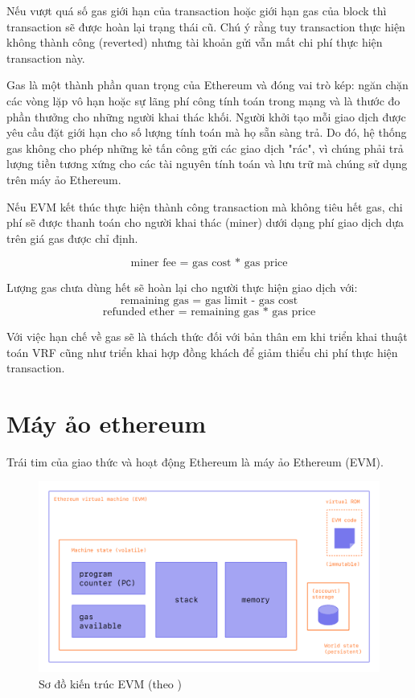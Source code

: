 \documentclass[../main.tex]{subfiles}
\begin{document}
Nếu vượt quá số gas giới hạn của transaction hoặc giới hạn gas của block thì transaction sẽ được hoàn lại trạng thái cũ. Chú ý rằng tuy transaction thực hiện không thành công (reverted) nhưng tài khoản gửi vẫn mất chi phí thực hiện transaction này.

Gas là một thành phần quan trọng của Ethereum và đóng vai trò kép: ngăn chặn các vòng lặp vô hạn hoặc sự lãng phí công tính toán trong mạng và là thước đo phần thưởng cho những người khai thác khối. Người khởi tạo mỗi giao dịch được yêu cầu đặt giới hạn cho số lượng tính toán mà họ sẵn sàng trả. Do đó, hệ thống gas không cho phép những kẻ tấn công gửi các giao dịch "rác", vì chúng phải trả lượng tiền tương xứng cho các tài nguyên tính toán và lưu trữ mà chúng sử dụng trên máy ảo Ethereum.

Nếu EVM kết thúc thực hiện thành công transaction mà không tiêu hết gas, chi phí sẽ được thanh toán cho người khai thác (miner) dưới dạng phí giao dịch dựa trên giá gas được chỉ định.

\begin{equation*}
    \text{miner fee = gas cost * gas price}
\end{equation*}

Lượng gas chưa dùng hết sẽ hoàn lại cho người thực hiện giao dịch với:
\begin{equation*}
    \text{remaining gas = gas limit - gas cost} 
\end{equation*}
\begin{equation*}
    \text{refunded ether = remaining gas * gas price}
\end{equation*}



Với việc hạn chế về gas sẽ là thách thức đối với bản thân em khi triển khai thuật toán VRF cũng như triển khai hợp đồng khách để giảm thiểu chi phí thực hiện transaction. 

\section{Máy ảo ethereum}
Trái tim của giao thức và hoạt động Ethereum là máy ảo Ethereum (EVM). 

\begin{figure}[h!]
    \centering
    \includegraphics[scale = 0.4]{Figure/evm.png}
    \caption{Sơ đồ kiến trúc EVM (theo \cite{ethereumWhitePaper})}
    \label{fig:evm}
\end{figure}
\end{document}
